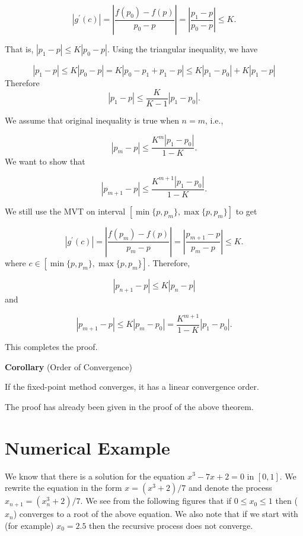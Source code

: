 \documentclass[
]{book}
\begin{document}
\[
|g^\prime(c)| = \left|\frac{f(p_0)-f(p)}{p_0-p} \right| = \left|\frac{p_1-p}{p_0-p} \right|\le K.
\]

That is, \(|p_1-p| \le K|p_0-p|\). Using the triangular inequality, we have

\[
|p_1 - p| \le K|p_0-p| = K|p_0 - p_1 + p_1 -p| \le K|p_1-p_0| + K|p_1-p|
\]
Therefore
\[
|p_1-p|\le\frac{K}{K-1}|p_1-p_0|.
\]

We assume that original inequality is true when \(n = m\), i.e.,

\[
|p_m-p| \le \frac{K^m|p_1-p_0|}{1-K}.
\]
We want to show that

\[
|p_{m+1}-p| \le \frac{K^{m+1}|p_1-p_0|}{1-K}.
\]

We still use the MVT on interval \([\min\{p, p_m\}, \max\{p, p_m\}]\) to get

\[
|g^\prime(c)| = \left|\frac{f(p_m)-f(p)}{p_m-p} \right| = \left|\frac{p_{m+1}-p}{p_m-p} \right|\le K.
\]
where \(c\in [\min\{p, p_m\}, \max\{p, p_m\}]\). Therefore,

\[
|p_{n+1}-p| \le K|p_n - p|
\]
and

\[
|p_{m+1} - p| \le K|p_m-p_0| = \frac{K^{m+1}}{1-K}|p_1-p_0|.
\]

This completes the proof.

\textbf{Corollary} (Order of Convergence)

If the fixed-point method converges, it has a linear convergence order.

The proof has already been given in the proof of the above theorem.

\hfill\break

\hypertarget{numerical-example-1}{%
\section{Numerical Example}\label{numerical-example-1}}

We know that there is a solution for the equation \(x^3-7x+2 = 0\) in \([0, 1]\). We rewrite the equation in the form \(x = (x^3 + 2)/7\) and denote the process \(x_{n+1} = (x^3_n + 2)/7\). We see from the following figures that if \(0 \le x_0 \le 1\) then (\(x_n\)) converges to a root of the above equation. We also note that if we start with (for example) \(x_0 = 2.5\) then the recursive process does not converge.
\end{document}
